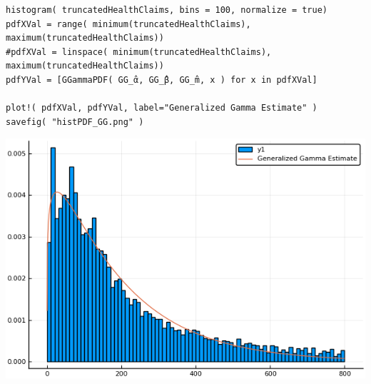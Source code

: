 \documentclass[12pt, letterpaper]{paper}
\begin{document}
\begin{verbatim}
histogram( truncatedHealthClaims, bins = 100, normalize = true)
pdfXVal = range( minimum(truncatedHealthClaims), maximum(truncatedHealthClaims))
#pdfXVal = linspace( minimum(truncatedHealthClaims), maximum(truncatedHealthClaims))
pdfYVal = [GGammaPDF( GG_̂α, GG_̂β, GG_̂m, x ) for x in pdfXVal]

plot!( pdfXVal, pdfYVal, label="Generalized Gamma Estimate" )
savefig( "histPDF_GG.png" )
\end{verbatim}

\begin{center}
\includegraphics[width=.9\linewidth]{histPDF_GG.png}
\end{center}
\end{document}
